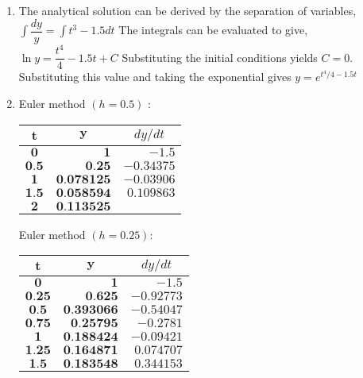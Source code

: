 \documentclass[../main.tex]{subfiles}
\begin{document}
\chapter{}
\label{cha:cha_18}

\section{}
\begin{enumerate}[label=\bfseries(\alph*)]
\item  The analytical solution can be derived by the separation of variables,
	\bigbreak
$\displaystyle\int \dfrac{d y}{y}=\int t^{3}-1.5 d t$
	\bigbreak
The integrals can be evaluated to give,
	\bigbreak
$\ln y=\dfrac{t^{4}}{4}-1.5 t+C$
	\bigbreak
Substituting the initial conditions yields $C=0$. Substituting this value and taking the exponential gives
	\bigbreak
$y=e^{t^{4} / 4-1.5 t}$
	\bigbreak
\item  Euler method $(h=0.5)$ :
	\bigbreak
\begin{tabular}{crr}
\hline
$\boldsymbol{t}$ & \multicolumn{1}{c}{$\boldsymbol{y}$} & \multicolumn{1}{c}{$d y / d t$} \\
\hline
$\mathbf{0}$ & $\mathbf{1}$ & $-1.5$ \\
$\mathbf{0 . 5}$ & $\mathbf{0 . 2 5}$ & $-0.34375$ \\
$\mathbf{1}$ & $\mathbf{0 . 0 7 8 1 2 5}$ & $-0.03906$ \\
$\mathbf{1 . 5}$ & $\mathbf{0 . 0 5 8 5 9 4}$ & $0.109863$ \\
$\mathbf{2}$ & $\mathbf{0 . 1 1 3 5 2 5}$ &  \\
\hline
\end{tabular}
	\bigbreak
Euler method $(h=0.25):$
	\bigbreak
\begin{tabular}{crr}
\hline
$\boldsymbol{t}$ & \multicolumn{1}{c}{$\boldsymbol{y}$} & \multicolumn{1}{c}{$d y / d t$} \\
\hline
$\mathbf{0}$ & $\mathbf{1}$ & $-1.5$ \\
$\mathbf{0 . 2 5}$ & $\mathbf{0 . 6 2 5}$ & $-0.92773$ \\
$\mathbf{0 . 5}$ & $\mathbf{0 . 3 9 3 0 6 6}$ & $-0.54047$ \\
$\mathbf{0 . 7 5}$ & $\mathbf{0 . 2 5 7 9 5}$ & $-0.2781$ \\
$\mathbf{1}$ & $\mathbf{0 . 1 8 8 4 2 4}$ & $-0.09421$ \\
$\mathbf{1 . 2 5}$ & $\mathbf{0 . 1 6 4 8 7 1}$ & $0.074707$ \\
$\mathbf{1 . 5}$ & $\mathbf{0 . 1 8 3 5 4 8}$ & $0.344153$ \\

\end{tabular}
\end{enumerate}
\end{document}
